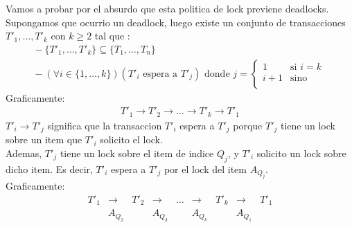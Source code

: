\documentclass[a4paper]{article}
\begin{document}
	Vamos a probar por el absurdo que esta politica de lock previene deadlocks.\\
	
	Supongamos que ocurrio un deadlock, luego existe un conjunto de transacciones $T'_1,\ldots,T'_k$ con $k \geq 2$ tal que :
	\begin{displaymath}
		\left.
			\begin{array}{l}
				-\ \{T'_1,\ldots,T'_k\} \subseteq \{T_1,\ldots,T_n\}\\
				-\ (\forall i \in \{1,\ldots,k\}) (T'_i \mbox{ espera a } T'_j) \mbox{ donde }
				j = 
				\left\{
					\begin{array}{cl}
						1 & \textrm{si } i = k \\
						i+1 & \textrm{sino }\\
					\end{array}
				\right.
			\end{array}
		\right.
	\end{displaymath}
	Graficamente:
	\begin{eqnarray*}
		T'_1 \longrightarrow T'_2 \longrightarrow \ldots \longrightarrow T'_k \longrightarrow T'_1
	\end{eqnarray*}
	$T'_i \longrightarrow T'_j$ significa que la transaccion $T'_i$ espera a $T'_j$ porque $T'_j$ tiene un lock sobre un item que $T'_i$ solicito el lock.\\
	Ademas, $T'_j$ tiene un lock sobre el item de indice $Q_j$, y $T'_i$ solicito un lock sobre dicho item. Es decir, $T'_i$ espera a $T'_j$ por el lock del item $A_{Q_j}$.\\
	Graficamente:
	\begin{displaymath}
		\left.
			\begin{array}{ccccccccc}
				T'_1 & \longrightarrow & T'_2 & \longrightarrow & \ldots & \longrightarrow & T'_k & \longrightarrow & T'_1 \\
				     & A_{Q_2}         &      & A_{Q_3}         &        & A_{Q_k}         &      & A_{Q_1}         &
			\end{array}
		\right.	
	\end{displaymath}
	
	
\end{document}
